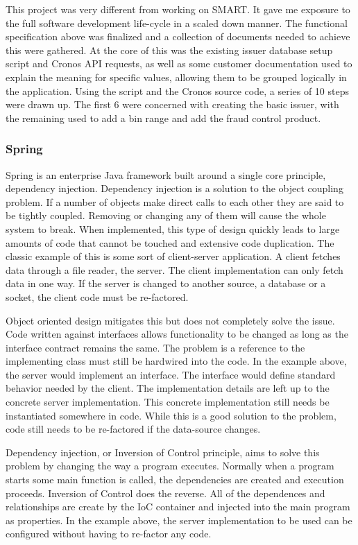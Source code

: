\documentclass[a4paper, 11pt, titlepage]{article}
\begin{document}
This project was very different from working on SMART. It gave me exposure to the full software development life-cycle in a scaled down manner. The functional specification above was finalized and a collection of documents needed to achieve this were gathered. At the core of this was the existing issuer database setup script and Cronos API requests, as well as some customer documentation used to explain the meaning for specific values, allowing them to be grouped logically in the application. 
Using the script and the Cronos source code, a series of 10 steps were drawn up. The first 6 were concerned with creating the basic issuer, with the remaining used to add a bin range and add the fraud control product. 
 
\subsubsection{Spring} 
 
Spring is an enterprise Java framework built around a single core principle, dependency injection. Dependency injection is a solution to the object coupling problem. If a number of objects make direct calls to each other they are said to be tightly coupled. Removing or changing any of them will cause the whole system to break. When implemented, this type of design quickly leads to large amounts of code that cannot be touched and extensive code duplication. The classic example of this is some sort of client-server application. A client fetches data through a file reader, the server. The client implementation can only fetch data in one way. If the server is changed to another source, a database or a socket, the client code must be re-factored.  
 
Object oriented design mitigates this but does not completely solve the issue. Code written against interfaces allows functionality to be changed as long as the interface contract remains the same. The problem is a reference to the implementing class must still be hardwired into the code. In the example above, the server would implement an interface. The interface would define standard behavior needed by the client. The implementation details are left up to the concrete server implementation. This concrete implementation still needs be instantiated somewhere in code. While this is a good solution to the problem, code still needs to be re-factored if the data-source changes. 
 
Dependency injection, or Inversion of Control principle, aims to solve this problem by changing the way a program executes. Normally when a program starts some main function is called, the dependencies are created and execution proceeds. Inversion of Control does the reverse. All of the dependences and relationships are create by the IoC container and injected into the main program as properties.  In the example above, the server implementation to be used can be configured without having to re-factor any code. 
 
\end{document}
